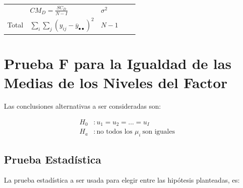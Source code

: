 \documentclass[]{book}
\theoremstyle{definition}
\theoremstyle{definition}
\theoremstyle{definition}
\theoremstyle{remark}
\begin{document}
\begin{longtable}[]{@{}lllll@{}}
\begin{minipage}[t]{0.04\columnwidth}
\end{minipage} & \begin{minipage}[t]{0.15\columnwidth}\raggedright
\(CM_D = \frac{SC_D}{N - I}\)\strut
\end{minipage} & \begin{minipage}[t]{0.27\columnwidth}\raggedright
\(\sigma^{2}\)\strut
\end{minipage}\tabularnewline
\begin{minipage}[t]{0.10\columnwidth}\raggedright
Total\strut
\end{minipage} & \begin{minipage}[t]{0.30\columnwidth}\raggedright
\(\sum_{i}^{}{\sum_{j}^{}\left( y_{ij} - {\overline{y}}_{\bullet\bullet} \right)^{2}}\)\strut
\end{minipage} & \begin{minipage}[t]{0.04\columnwidth}\raggedright
\(N - 1\)\strut
\end{minipage} & \begin{minipage}[t]{0.15\columnwidth}\raggedright
\strut
\end{minipage} & \begin{minipage}[t]{0.27\columnwidth}\raggedright
\strut
\end{minipage}\tabularnewline
\bottomrule
\end{longtable}

\hypertarget{prueba-f-para-la-igualdad-de-las-medias-de-los-niveles-del-factor}{%
\section{Prueba F para la Igualdad de las Medias de los Niveles del
Factor}\label{prueba-f-para-la-igualdad-de-las-medias-de-los-niveles-del-factor}}

Las conclusiones alternativas a ser consideradas son:

\[
\begin{aligned}
H_{0} &: u_{1} = u_{2} = \ldots = u_{I}\\
H_{a} &: \text{no todos los } \mu_{i}\ \text{son iguales}
\end{aligned}
\]

\hypertarget{prueba-estadistica}{%
\subsection{Prueba Estadística}\label{prueba-estadistica}}

La prueba estadística a ser usada para elegir entre las hipótesis
planteadas, es:
\end{document}
